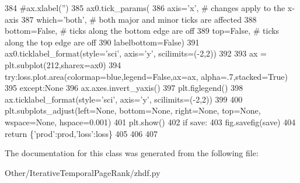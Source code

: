 \begin{DoxyCode}
384             \textcolor{comment}{#ax.xlabel('')}
385             ax0.tick\_params(
386                 axis=\textcolor{stringliteral}{'x'},          \textcolor{comment}{# changes apply to the x-axis}
387                 which=\textcolor{stringliteral}{'both'},      \textcolor{comment}{# both major and minor ticks are affected}
388                 bottom=\textcolor{keyword}{False},      \textcolor{comment}{# ticks along the bottom edge are off}
389                 top=\textcolor{keyword}{False},         \textcolor{comment}{# ticks along the top edge are off}
390                 labelbottom=\textcolor{keyword}{False})
391             ax0.ticklabel\_format(style=\textcolor{stringliteral}{'sci'}, axis=\textcolor{stringliteral}{'y'}, scilimits=(-2,2))
392 
393             ax = plt.subplot(212,sharex=ax0)
394             \textcolor{keywordflow}{try}:loss.plot.area(colormap=blue,legend=\textcolor{keyword}{False},ax=ax, alpha=.7,stacked=\textcolor{keyword}{True})
395             \textcolor{keywordflow}{except}:\textcolor{keywordtype}{None}
396             ax.axes.invert\_yaxis()
397             plt.figlegend()
398             ax.ticklabel\_format(style=\textcolor{stringliteral}{'sci'}, axis=\textcolor{stringliteral}{'y'}, scilimits=(-2,2))
399 
400             plt.subplots\_adjust(left=\textcolor{keywordtype}{None}, bottom=\textcolor{keywordtype}{None}, right=\textcolor{keywordtype}{None}, top=\textcolor{keywordtype}{None}, wspace=\textcolor{keywordtype}{None}, hspace=0.001)
401             plt.show()
402             \textcolor{keywordflow}{if} save:
403                 fig.savefig(save)
404         \textcolor{keywordflow}{return} \{\textcolor{stringliteral}{'prod'}:prod,\textcolor{stringliteral}{'loss'}:loss\}
405 
406 
407 
\end{DoxyCode}


The documentation for this class was generated from the following file\+:\begin{DoxyCompactItemize}
\item 
Other/\+Iterative\+Temporal\+Page\+Rank/zhdf.\+py\end{DoxyCompactItemize}
